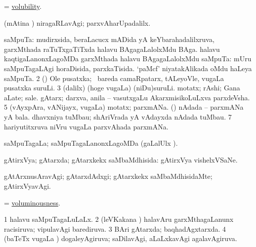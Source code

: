 \bentry 
{} 
\gl{\nA}
\expl{}
\bmng
 = \hyperlink{volubility}{volubility}. 
\emng
\eentry

\bentry
{} 
\gl{\kirxvi}
\expl{}
\bmng
 (mAtina \vi) niragaRLavAgi; parxvAharUpadalilx. 
\emng
\eentry

\bentry 
{} 
\gl{\nA}
\expl{}
\bmng
\bnum
{} saMpuTa: 
\banum
{} mudirxsida, beraLacucx mADida yA keYbarahadalilxruva, garxMthada raTuTxgaTiTxda halavu BAgagaLalolxMdu BAga. 
 halavu kaqtigaLanonxLagoMDa garxMthada halavu BAgagaLalolxMdu saMpuTa:  mUru saMpuTagaLAgi horaDisida, parxkaTisida.  `paMcf' niyatakAlikada oMdu haLeya saMpuTa. 
\eanum
\numie
\num{2} (\ca) Ole pusatxka; \sA\ bareda camaRpatarx, tALeyoVle, \mo vugaLa pusatxka suruLi. 
\num{3} (\bava dalilx) (hoge \mo vugaLa) (niDu)suruLi. 
\banum
{} motatx; rAshi; Gana aLate; sale. 
 gAtarx; darxva, anila -- vasutxgaLu AkarxmisikoLuLxva parxdeVsha. 
\eanum
\numie
\num{5} (vAyxpAra, vANijayx, \mo vugaLa) motatx; parxmANa. 
 (\saM) 
\banum
{} nAdada -- parxmANa yA bala. 
 dhavxniya tuMbau; shAriVrada yA vAdayxda nAdada tuMbau. 
\eanum
\numie
\num{7} hariyutitxruva niVru \mo vugaLa parxvAhada parxmANa. 
\enum
\emng
\eentry

\bentry
{} 
\gl{\gu}
\expl{}
\bmng
 saMpuTagaLa; saMpuTagaLanonxLagoMDa (\saMpa gaLalUlx \parx). 
\emng
\eentry

\bentry 
{} 
\gl{\gu}
\expl{}
\bmng
 gAtirxVya; gAtarxda; gAtarxkekx saMbaMdhisida:  gAtirxVya vishelxVSaNe. 
\emng
\eentry

\bentry
{} 
\gl{\kirxvi}
\expl{}
\bmng
 gAtArxnusAravAgi; gAtarxdAdxgi; gAtarxkekx saMbaMdhisidaMte; gAtirxVyavAgi. 
\emng
\eentry

\bentry
{} 
\gl{\nA}
\expl{}
\bmng
 = \hyperlink{voluminousness}{voluminousness}. 
\emng
\eentry

\bentry
{} 
\gl{\gu}
\expl{}
\bmng
\bnum
\num{1} halavu saMpuTagaLuLaLx. 
\num{2} (leVKakana \vi) halavAru garxMthagaLanunx racisiruva; vipulavAgi barediruva. 
\num{3} BAri gAtarxda; baqhadAgxtarxda. 
\num{4} (baTeTx \mo vugaLa \vi) dogaleyAgiruva; saDilavAgi, aLaLxkavAgi agalavAgiruva. 
\enum
\emng
\eentry

